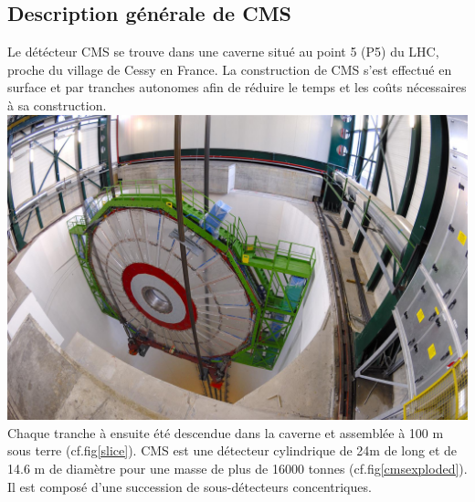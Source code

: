 \subsection{Description générale de CMS}
Le détécteur CMS se trouve dans une caverne situé au point 5 (P5) du LHC, proche du village de Cessy en France. La construction de CMS s'est effectué en surface et par tranches autonomes afin de réduire le temps et les coûts nécessaires à sa construction.
\marginpar
{
	\centering
	\includegraphics[width=\marginparwidth]{CMS/slice.jpg}
	\label{slice}
}
Chaque tranche à ensuite été descendue dans la caverne et assemblée à 100 m sous terre (cf.fig\ref{slice}).
CMS est une détecteur cylindrique de 24m de long et de 14.6 m de diamètre pour une masse de plus de 16000 tonnes (cf.fig\ref{cmsexploded}). Il est composé d'une succession de sous-détecteurs concentriques.

